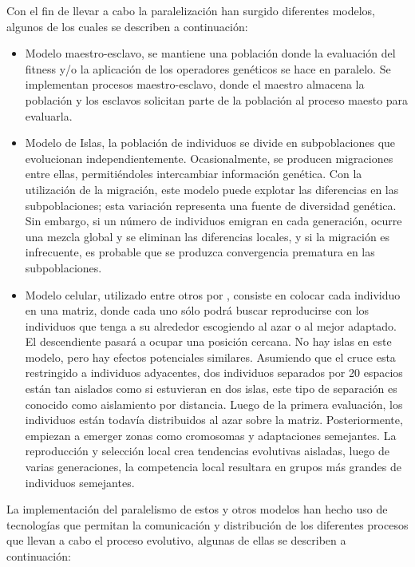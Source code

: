 Con el fin de llevar a cabo la paralelizaci\'on han surgido diferentes modelos, algunos de los cuales se describen a continuación:

\begin{itemize}
	\item Modelo maestro-esclavo, se mantiene una población donde la evaluación del fitness y/o la aplicación de los operadores genéticos se hace en paralelo. Se implementan procesos maestro-esclavo, donde el maestro almacena la población y los esclavos solicitan parte de la población al proceso maesto para evaluarla.
	\item Modelo de Islas, la población de individuos se divide en subpoblaciones que evolucionan independientemente. Ocasionalmente, se producen migraciones entre ellas, permitiéndoles intercambiar información genética. Con la utilización de la migración, este modelo puede explotar las diferencias en las subpoblaciones; esta variación representa una fuente de diversidad genética. Sin embargo, si un número de individuos emigran en cada generación, ocurre una mezcla global y se eliminan las diferencias locales, y si la migración es infrecuente, es probable que se produzca convergencia prematura en las subpoblaciones.
	\item Modelo celular, utilizado entre otros por \cite{DBLP:journals/tec/FolinoPS03}, consiste en colocar cada individuo en una matriz, donde cada uno sólo podrá buscar reproducirse con los individuos que tenga a su alrededor escogiendo al azar o al mejor adaptado. El descendiente pasar\'a a ocupar una posición cercana. No hay islas en este modelo, pero hay efectos potenciales similares. Asumiendo que el cruce esta restringido a individuos adyacentes, dos individuos separados por 20 espacios están tan aislados como si estuvieran en dos islas, este tipo de separación es conocido como aislamiento por distancia. Luego de la primera evaluación, los individuos están todavía distribuidos al azar sobre la matriz. Posteriormente, empiezan a emerger zonas como cromosomas y adaptaciones semejantes. La reproducción y selección local crea tendencias evolutivas aisladas, luego de varias generaciones, la competencia local resultara en grupos m\'as grandes de individuos semejantes.
\end{itemize}

La implementación del paralelismo de estos y otros modelos han hecho uso de tecnologías que permitan la comunicación y distribución de los diferentes procesos que llevan a cabo el proceso evolutivo, algunas de ellas se describen a continuación:

